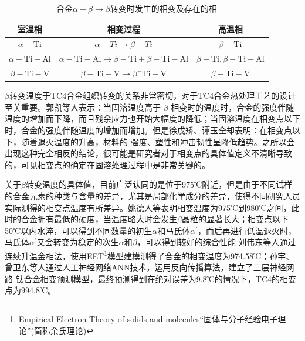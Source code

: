 \begin{table}[htbp]
	\centering
	\caption{\ti 合金$ \alpha+\beta \to \beta $转变时发生的相变及存在的相}
	\label{sec:Tc4betachange}
	\begin{tabular}{ccc}
		\toprule 室温相 & 相变过程 & 高温相 \\
		\midrule$\alpha-\mathrm{Ti}$ & $\alpha-T i \rightarrow \beta-T i$ & $\beta-\mathrm{Ti}$ \\
		$\alpha-\mathrm{Ti}-\mathrm{Al}$ & $\alpha-\mathrm{Ti}-\mathrm{Al} \rightarrow \beta-\mathrm{Ti}+\beta-\mathrm{Ti}-\mathrm{Al}$ & $\beta-\mathrm{Ti}, \beta-\mathrm{Ti}-\mathrm{Al}$ \\
		$\beta- \mathrm{Ti}-\mathrm{V}$ & $\beta-\mathrm{Ti}-\mathrm{V} \rightarrow \beta^{-} \mathrm{Ti}-\mathrm{V}$ & $\beta-\mathrm{Ti}-\mathrm{V}$ \\
		\bottomrule
	\end{tabular}
\end{table}

$\beta$转变温度于TC4合金组织转变的关系非常密切，对于TC4合金热处理工艺的设计至关重要。郭凯\cite{guokaiTC4taihejinrechuligongyideyanjiuxianzhuangjijinzhan2021}等人表示：当固溶温度高于 $\beta$ 相变时的温度时，合金的强度伴随温度的增加而下降，而且残余应力也开始大幅度的降低；当固溶温度在相变点以下时，合金的强度伴随温度的增加而增加。但是徐戊矫、谭玉全\cite{xujianGurongshixiaogongyiduiTC4taihejinzuzhijixingnengdeyingxiang2014}却表明：在相变点以下，随着退火温度的升高，材料的 强度、塑性和冲击韧性呈降低趋势。之所以会出现这种完全相反的结论，很可能是研究者对于相变点的具体值定义不清晰导致的，可见相变点的确定在固溶处理过程中是非常关键的。


关于$\beta$转变温度的具体值，目前广泛认同的是位于975℃附近，但是由于不同试样的合金元素的种类与含量的差异，尤其是局部化学成分的差异，使得不同研究人员实际测得的相变点温度有所差异\cite{wangtaoTC4hejinxiangbianwendujiancezhongjieguobuyizhiyuanyinfenxi2013}。姚德人等\cite{yaoderenTc4taihejinxiangbiandiandeceding1975}表明相变温度为975℃到980℃之间，此时的合金拥有最低的硬度，当温度略大时会发生$\beta$晶粒的显著长大；相变点以下50℃以内水淬，可以得到不同数量的初生$ \alpha $和马氏体$ \alpha^{\prime} $，而后再进行低温退火时，马氏体$ \alpha^{\prime} $又会转变为稳定的次生$ \alpha$和$ \beta $，可以得到较好的综合性能%
刘伟东等人\cite{liuweidongTC4hejinVzhuanbianwendudejinxiangfacedingyulilunjisuan2014}通过连续升温金相法，使用EET\footnote{Empirical Electron Theory of solids and molecules“固体与分子经验电子理论”(简称余氏理论)}模型建模测得了\ti 合金的相变温度为974.58℃；孙宇、曾卫东等人\cite{sunyuYingyongrengongshenjingwangluoyanjiuhuaxueyuansuduitaihejinxiangbiandiandeyingxiang2010}通过人工神经网络ANN技术，运用反向传播算法，建立了三层神经网路-钛合金相变预测模型，最终预测得到在绝对误差为9.8℃的情况下，TC4的相变点为994.8℃。

